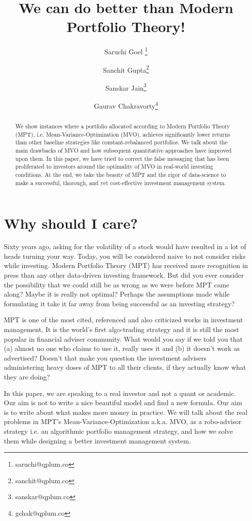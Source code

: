 \documentclass[a4paper]{article}
\author[1]{Saruchi Goel \thanks{saruchi@qplum.co}}
\author[1]{Sanchit Gupta\thanks{sanchit@qplum.co}}
\author[1]{Sanskar Jain\thanks{sanskar@qplum.co}}
\author[1]{Gaurav Chakravorty\thanks{gchak@qplum.co}}
\affil[1]{qplum Investment Research}
\title{ We can do better than Modern Portfolio Theory!}
\date{}
\begin{document}
\thispagestyle{empty}
\maketitle
\thispagestyle{fancy}
\begin{abstract}
We show instances where a portfolio allocated according to Modern Portfolio Theory (MPT), i.e. Mean-Variance-Optimization (MVO), achieves significantly lower returns than other baseline strategies like constant-rebalanced portfolios. We talk about the main drawbacks of MVO and how subsequent quantitative approaches have improved upon them. In this paper, we have tried to correct the false messaging that has been proliferated to investors around the optimality of MVO in real-world investing conditions. At the end, we take the beauty of MPT and the rigor of data-science to make a successful, thorough, and yet cost-effective investment management system.
\end{abstract}

\section{Why should I care?}

Sixty years ago, asking for the volatility of a stock would have resulted in a lot of heads turning your way. Today, you will be considered naive to not consider risks while investing. Modern Portfolio Theory (MPT) has received more recognition in press than any other data-driven investing framework. But did you ever consider the possibility that we could still be as wrong as we were before MPT came along? Maybe it is really not optimal? Perhaps the assumptions made while formulating it take it far away from being successful as an investing strategy?

MPT is one of the most cited, referenced and also criticized works in investment management. It is the world’s first algo-trading strategy and it is still the most popular in financial adviser community. What would you say if we told you that (a) almost no one who claims to use it, really uses it and (b) it doesn’t work as advertised? Doesn’t that make you question the investment advisers administering heavy doses of MPT to all their clients, if they actually know what they are doing?

In this paper, we are speaking to a real investor and not a quant or academic. Our aim is not to write a nice beautiful model and find a new formula. Our aim is to write about what makes more money in practice. We will talk about the real problems in MPT’s Mean-Variance-Optimization a.k.a. MVO, as a robo-advisor strategy i.e. an algorithmic portfolio management strategy, and how we solve them while designing a better investment management system. 
\end{document}

